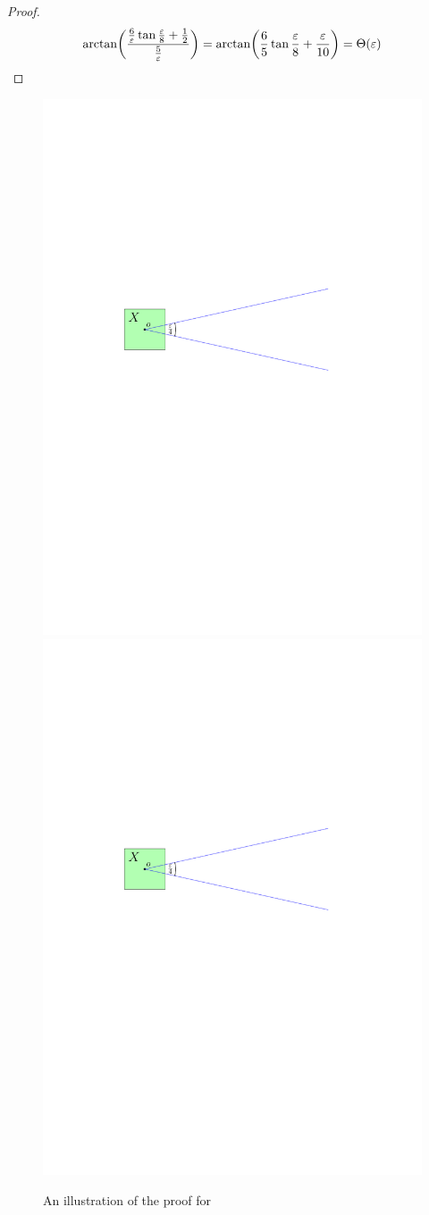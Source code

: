 \documentclass[12pt]{article}%
\begin{document}
\begin{proof}
    \begin{equation*}
 	\arctan
        \pth{\frac{\frac{6}{\eps}
              \tan\frac{\eps}{8}+\frac{1}{2}}{\frac{5}{\eps}}
        }%
        =%
        \arctan \pth{ \frac{6}{5}\tan\frac{\eps}{8}+\frac{\eps}{10} }%
        =%
        \Theta(\eps)%
   \end{equation*}
\end{proof}

\begin{figure}[h]
    \phantom{}\hfill%
    \includegraphics[page=2, width=0.48\linewidth]{figs/double_wedge}%
    \hfill%
    \includegraphics[page=3, width=0.48\linewidth]{figs/double_wedge}%
    \hfill%
    \phantom{}%
    \caption{An illustration of the proof for }
\end{figure}

\end{document}
